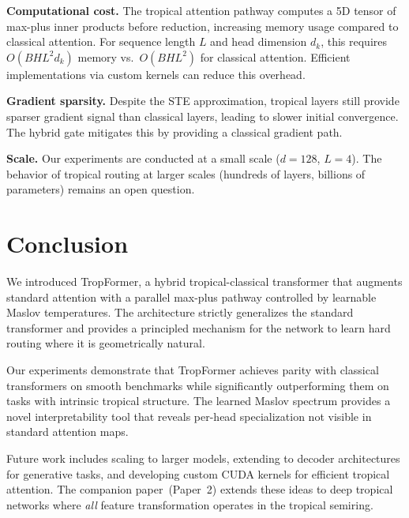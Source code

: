 \documentclass[11pt,twocolumn]{article}
\begin{document}
\textbf{Computational cost.} The tropical attention pathway computes a 5D
tensor of max-plus inner products before reduction, increasing memory usage
compared to classical attention. For sequence length $L$ and head dimension
$d_k$, this requires $O(BHL^2d_k)$ memory vs.\ $O(BHL^2)$ for classical
attention. Efficient implementations via custom kernels can reduce this
overhead.

\textbf{Gradient sparsity.} Despite the STE approximation, tropical layers
still provide sparser gradient signal than classical layers, leading to
slower initial convergence. The hybrid gate mitigates this by providing a
classical gradient path.

\textbf{Scale.} Our experiments are conducted at a small scale
($d = 128$, $L = 4$). The behavior of tropical routing at larger scales
(hundreds of layers, billions of parameters) remains an open question.

\section{Conclusion}\label{sec:conclusion}

We introduced TropFormer, a hybrid tropical-classical transformer that
augments standard attention with a parallel max-plus pathway controlled by
learnable Maslov temperatures. The architecture strictly generalizes the
standard transformer and provides a principled mechanism for the network to
learn hard routing where it is geometrically natural.

Our experiments demonstrate that TropFormer achieves parity with classical
transformers on smooth benchmarks while significantly outperforming them on
tasks with intrinsic tropical structure. The learned Maslov spectrum provides
a novel interpretability tool that reveals per-head specialization not
visible in standard attention maps.

Future work includes scaling to larger models, extending to decoder
architectures for generative tasks, and developing custom CUDA kernels for
efficient tropical attention. The companion paper~(Paper~2) extends these
ideas to deep tropical networks where \emph{all} feature transformation
operates in the tropical semiring.
\end{document}
